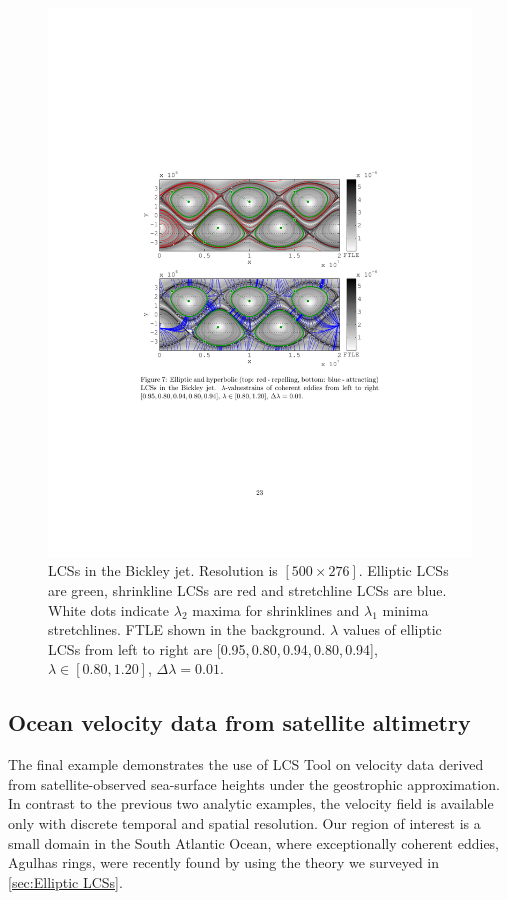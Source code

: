 \documentclass{elsarticle}
\begin{document}
\begin{figure}
\centering
\includegraphics[width=.85\textwidth]{graphics/bickley_jet/lambda_hyperbolic_lcs}
\caption{
LCSs in the Bickley jet.
Resolution is $[500 \times 276]$.
Elliptic LCSs are green, shrinkline LCSs are red and stretchline LCSs are blue. 
White dots indicate $\lambda_2$ maxima for shrinklines and $\lambda_1$ minima stretchlines.
FTLE shown in the background.
$\lambda$ values of elliptic LCSs from left to right are [0.95,\,0.80,\,0.94,\,0.80,\,0.94], $\lambda \in [0.80,1.20]$, $\Delta\lambda = 0.01$.
}
\label{f:Bickley jet LCS}
\end{figure}

\subsection{Ocean velocity data from satellite altimetry}
\label{sec:oceandataset}

The final example demonstrates the use of LCS Tool on velocity data derived from satellite-observed sea-surface heights under the geostrophic approximation. In contrast to the previous two analytic examples, the velocity field is available only with discrete temporal and spatial resolution. Our region of interest is a small domain in the South Atlantic Ocean, where exceptionally coherent eddies, Agulhas rings, were recently found by \citet{haller13:_coher_lagran} using the theory we surveyed in \cref{sec:Elliptic LCSs}.
\end{document}
